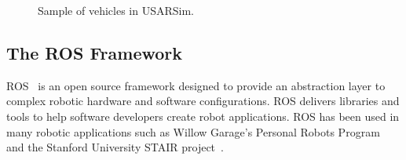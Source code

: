 \begin{figure}[t!]
\centering
{}\qquad
{}\qquad
{}\qquad
{}
\caption{Sample of vehicles in USARSim.}
\end{figure}

\subsection*{The ROS Framework}

ROS~\cite{ROSWeb} is an open source framework designed to provide an abstraction layer to complex robotic hardware and software configurations. ROS delivers libraries and tools to help software developers create robot applications. ROS has been used in many robotic applications such as
Willow Garage's Personal Robots Program~\cite{WYOBEK.ICRA.2008} and the Stanford University STAIR project~\cite{QUIGLEY.AAAI.2007}.

